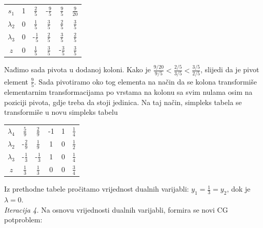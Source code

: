 \documentclass[a4paper, utf8, 11pt, colorlinks]{book}
\begin{document}
\begin{center}
	
	\begin{tabular}{c|cccc|c}
		$s_1$	    &   1      &    $\frac{2}{5}$          &   -$\frac{9}{5}$       &  $\frac{9}{5} $        &  $\frac{9}{20}$ \\
		$\lambda_2$  &   0      &    $\frac{1}{5}$         &   $\frac{3}{5}$        &   $\frac{2}{5}$        &  $\frac{3}{5}$             \\
		$\lambda_3$  &   0      &    -$\frac{1}{5}$        &   $\frac{2}{5}$        &   $\frac{3}{5}$         &  $\frac{2}{5}$            \\ \hline
		$z$          &   0      &    $\frac{1}{5}$         &  $ \frac{3}{5}$        &   -$\frac{3}{5}$         & $\frac{3}{5}$
	\end{tabular}
	
\end{center} 
Nađimo sada pivota u dodanoj koloni. Kako je $\frac{9/20}{9/5} < \frac{2/5}{3/5}< \frac{3/5}{2/5}$, slijedi da je pivot element $\frac{9}{5}$.  Sada pivotiramo oko tog elementa na način da se kolona transformiše elementarnim transformacijama po vrstama na kolonu sa svim nulama osim na poziciji pivota, gdje treba da stoji jedinica. Na taj način, simpleks tabela se transformiše u novu simpleks tabelu 
\begin{center}
	
	\begin{tabular}{c|cccc|c}
		$\lambda_4$	 &   $\frac{5}{9}$      &    $\frac{2}{9}$          &   -1       &  1      &  $\frac{1}{4}$ \\
		$\lambda_2$  &   -$\frac{2}{9}$    &   $\frac{1}{9}$        &   1        &   0         &  $\frac{1}{2}$        \\
	    $\lambda_3$  &  -$\frac{1}{3}$     &    -$\frac{1}{3}$      &   1        &   0        &  $\frac{1}{4}$      
		    \\ \hline
		$z$          &   $\frac{1}{3}$     &    $\frac{1}{3}$         &  $0$        &  0         & $\frac{3}{4}$
	\end{tabular}
	
\end{center} 
Iz prethodne tabele pročitamo vrijednost dualnih varijabli: $y_1 =  \frac{1}{3}=y_2$, dok je $\lambda=0$. \\
\emph{Iteracija 4.} Na osnovu vrijednosti dualnih varijabli, formira se novi CG potproblem:
 
\end{document}
